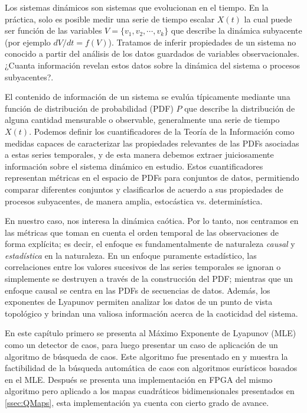 Los sistemas dinámicos son sistemas que evolucionan en el tiempo.
En la práctica, solo es posible medir una serie de tiempo escalar $X(t)$ la cual puede ser función de las variables $V=\{ v_1, v_2,\cdots, v_k\}$ que describe la dinámica subyacente (por ejemplo $dV/dt=f(V)$).
Tratamos de inferir propiedades de un sistema no conocido a partir del análisis de los datos guardados de variables observacionales.
¿Cuanta información revelan estos datos sobre la dinámica del sistema o procesos subyacentes?.

El contenido de información de un sistema se evalúa típicamente mediante una función de distribución de probabilidad (PDF) $P$ que describe la distribución de alguna cantidad mensurable o observable, generalmente una serie de tiempo $X(t)$.
Podemos definir los cuantificadores de la Teoría de la Información como medidas capaces de caracterizar las propiedades relevantes de las PDFs asociadas a estas series temporales, y de esta manera debemos extraer juiciosamente información sobre el sistema dinámico en estudio.
Estos cuantificadores representan métricas en el espacio de PDFs para conjuntos de datos, permitiendo comparar diferentes conjuntos y clasificarlos de acuerdo a sus propiedades de procesos subyacentes, de manera amplia, estocástica vs. determinística.

En nuestro caso, nos interesa la dinámica caótica.
Por lo tanto, nos centramos en las métricas que toman en cuenta el orden temporal de las observaciones de forma explícita; es decir, el enfoque es fundamentalmente de naturaleza \textit{causal} y \textit{estadística} en la naturaleza.
En un enfoque puramente estadístico, las correlaciones entre los valores sucesivos de las series temporales se ignoran o simplemente se destruyen a través de la construcción del PDF; mientras que un enfoque causal se centra en las PDFs de secuencias de datos.
Además, los exponentes de Lyapunov permiten analizar los datos de un punto de vista topológico y brindan una valiosa información acerca de la caoticidad del sistema.

En este capítulo primero se presenta al Máximo Exponente de Lyapunov (MLE) como un detector de caos, para luego presentar un caso de aplicación de un algoritmo de búsqueda de caos.
Este algoritmo fue presentado en \cite{CASE2013} y muestra la factibilidad de la búsqueda automática de caos con algoritmos eurísticos basados en el  MLE.
Después se presenta una implementación en FPGA del mismo algoritmo pero aplicado a los mapas cuadráticos bidimensionales presentados en \ref{ssec:QMaps}, esta implementación ya cuenta con cierto grado de avance.

